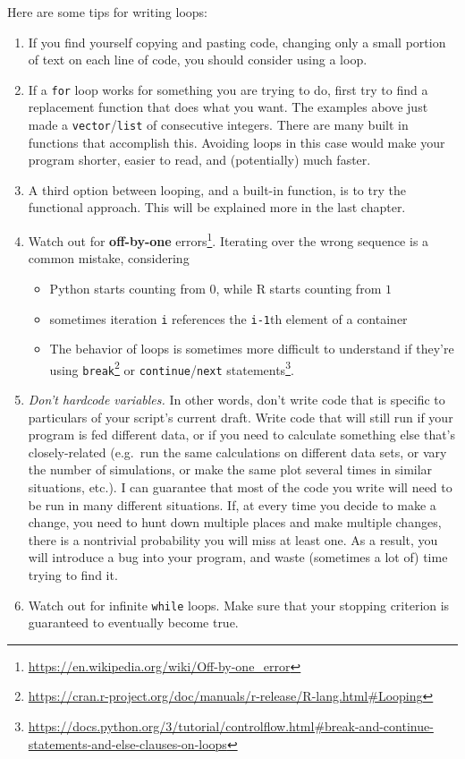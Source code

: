 \documentclass[12pt,krantz2]{krantz}
\providecommand{\tightlist}{%
  \setlength{\itemsep}{0pt}\setlength{\parskip}{0pt}}
\renewcommand{\href}[2]{#2\footnote{\url{#1}}}
\begin{document}
\begin{rmd-caution}

Here are some tips for writing loops:

\begin{enumerate}
\def\labelenumi{\arabic{enumi}.}
\tightlist
\item
  If you find yourself copying and pasting code, changing only a small portion of text on each line of code, you should consider using a loop.
\item
  If a \texttt{for} loop works for something you are trying to do, first try to find a replacement function that does what you want. The examples above just made a \texttt{vector}/\texttt{list} of consecutive integers. There are many built in functions that accomplish this. Avoiding loops in this case would make your program shorter, easier to read, and (potentially) much faster.
\item
  A third option between looping, and a built-in function, is to try the functional approach. This will be explained more in the last chapter.
\item
  Watch out for \href{https://en.wikipedia.org/wiki/Off-by-one_error}{\textbf{off-by-one} errors}. Iterating over the wrong sequence is a common mistake, considering

  \begin{itemize}
  \tightlist
  \item
    Python starts counting from \(0\), while R starts counting from \(1\)
  \item
    sometimes iteration \texttt{i} references the \texttt{i-1}th element of a container
  \item
    The behavior of loops is sometimes more difficult to understand if they're using \href{https://cran.r-project.org/doc/manuals/r-release/R-lang.html\#Looping}{\texttt{break}} or \href{https://docs.python.org/3/tutorial/controlflow.html\#break-and-continue-statements-and-else-clauses-on-loops}{\texttt{continue}/\texttt{next} statements}.
  \end{itemize}
\item
  \emph{Don't hardcode variables.} In other words, don't write code that is specific to particulars of your script's current draft. Write code that will still run if your program is fed different data, or if you need to calculate something else that's closely-related (e.g.~run the same calculations on different data sets, or vary the number of simulations, or make the same plot several times in similar situations, etc.). I can guarantee that most of the code you write will need to be run in many different situations. If, at every time you decide to make a change, you need to hunt down multiple places and make multiple changes, there is a nontrivial probability you will miss at least one. As a result, you will introduce a bug into your program, and waste (sometimes a lot of) time trying to find it.
\item
  Watch out for infinite \texttt{while} loops. Make sure that your stopping criterion is guaranteed to eventually become true.
\end{enumerate}


\end{rmd-caution}
\end{document}
